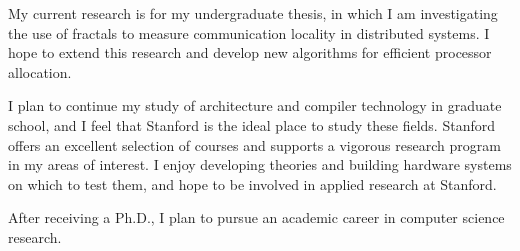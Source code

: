 My current research is for my undergraduate thesis, in which I am
investigating the use of fractals to measure communication locality in
distributed systems.  I hope to extend this research and develop new
algorithms for efficient processor allocation.

I plan to continue my study of architecture and compiler technology in
graduate school, and I feel that Stanford is the ideal place to study
these fields.  Stanford offers an excellent selection of courses and
supports a vigorous research program in my areas of interest.  I enjoy
developing theories and building hardware systems on which to test
them, and hope to be involved in applied research at Stanford.

After receiving a Ph.D., I plan to pursue an academic career in
computer science research.



